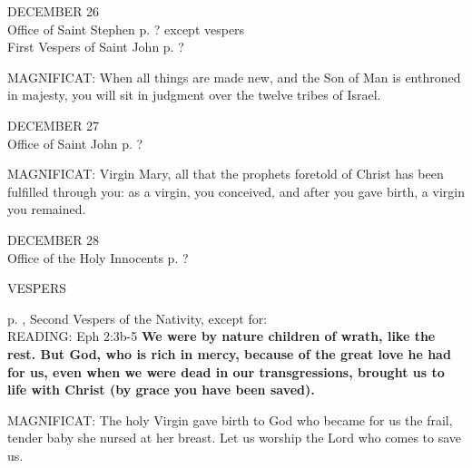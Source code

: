 \begin{center}\normalsize DECEMBER 26\\
\footnotesize {Office of Saint Stephen p. ? except vespers\\
First Vespers of Saint John p. ?\\}\end{center}

\noindent\small{\uppercase{MAGNIFICAT:}}	When all things are made new, and the Son of Man is enthroned in majesty, you will sit in judgment over the twelve tribes of Israel.\\

\begin{center}\normalsize DECEMBER 27\\
\footnotesize {Office of Saint John p. ?\\}
\end{center}

\noindent\small{\uppercase{MAGNIFICAT:}}	Virgin Mary, all that the prophets foretold of Christ has been fulfilled through you: as a virgin, you conceived, and after you gave birth, a virgin you remained.\\

\begin{center}\normalsize DECEMBER 28\\
\footnotesize {Office of the Holy Innocents p. ?\\}
\end{center}

\begin{flushleft}\normalsize{\uppercase{VESPERS\\}}\end{flushleft} \footnotesize  p. \pageref{christmas:nativity2ndVespers}, Second Vespers of the Nativity, except for:\\

\noindent\small{\uppercase{READING:}}    Eph 2:3b-5 \textbf{    We were by nature children of wrath, like the rest. But God, who is rich in mercy, because of the great love he had for us, even when we were dead in our transgressions, brought us to life with Christ (by grace you have been saved).\\}

\noindent\small{\uppercase{MAGNIFICAT:}}	The holy Virgin gave birth to God who became for us the frail, tender baby she nursed at her breast. Let us worship the Lord who comes to save us.\\
